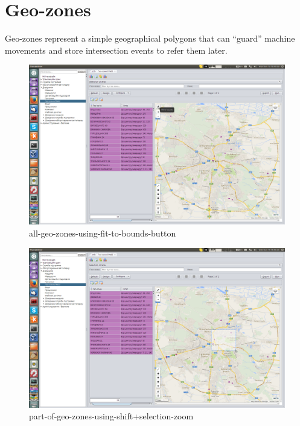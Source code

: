 \section{Geo-zones}
Geo-zones represent a simple geographical polygons that can ``guard'' machine movements and store 
intersection events to refer them later.

\begin{figure}[!htp]
\centering
\includegraphics[width=16cm]{chapters/01-geozones/images/01-all-geo-zones-using-fit-to-bounds-button.png}
\caption{all-geo-zones-using-fit-to-bounds-button}\label{fig:01}
\end{figure}

\begin{figure}[!htp]
\centering
\includegraphics[width=16cm]{chapters/01-geozones/images/02-part-of-geo-zones-using-shift+selection-zoom.png}
\caption{part-of-geo-zones-using-shift+selection-zoom}\label{fig:02}
\end{figure}

